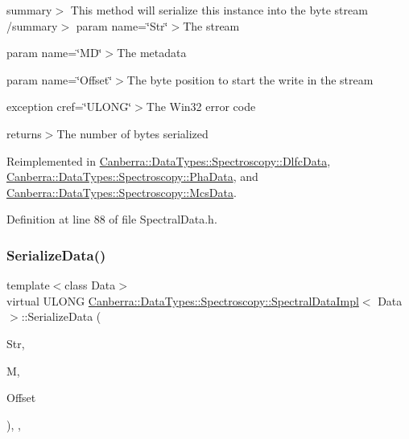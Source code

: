 summary$>$ This method will serialize this instance into the byte stream /summary$>$ param name=\char`\"{}\+Str\char`\"{}$>$The stream

param name=\char`\"{}\+M\+D\char`\"{}$>$The metadata

param name=\char`\"{}\+Offset\char`\"{}$>$The byte position to start the write in the stream

exception cref=\char`\"{}\+U\+L\+O\+N\+G\char`\"{}$>$The Win32 error code

returns$>$The number of bytes serialized

Reimplemented in \hyperlink{class_canberra_1_1_data_types_1_1_spectroscopy_1_1_dlfc_data_a90ac0d4fa457c81423ab25b9089dfa83_a90ac0d4fa457c81423ab25b9089dfa83}{Canberra\+::\+Data\+Types\+::\+Spectroscopy\+::\+Dlfc\+Data}, \hyperlink{class_canberra_1_1_data_types_1_1_spectroscopy_1_1_pha_data_a963a64048e3633af0a249054ce2c367f_a963a64048e3633af0a249054ce2c367f}{Canberra\+::\+Data\+Types\+::\+Spectroscopy\+::\+Pha\+Data}, and \hyperlink{class_canberra_1_1_data_types_1_1_spectroscopy_1_1_mcs_data_a7b3b725c711c1720c6c434d269f8664c_a7b3b725c711c1720c6c434d269f8664c}{Canberra\+::\+Data\+Types\+::\+Spectroscopy\+::\+Mcs\+Data}.



Definition at line 88 of file Spectral\+Data.\+h.

\mbox{\label{class_canberra_1_1_data_types_1_1_spectroscopy_1_1_spectral_data_impl_a4d4c4af29ad5f4fc977068478cdc8aeb_a4d4c4af29ad5f4fc977068478cdc8aeb}} 
\subsubsection{\texorpdfstring{Serialize\+Data()}{SerializeData()}}
{\footnotesize\ttfamily template$<$class Data$>$ \\
virtual U\+L\+O\+NG \hyperlink{class_canberra_1_1_data_types_1_1_spectroscopy_1_1_spectral_data_impl}{Canberra\+::\+Data\+Types\+::\+Spectroscopy\+::\+Spectral\+Data\+Impl}$<$ Data $>$\+::Serialize\+Data (\begin{DoxyParamCaption}\item[{\hyperlink{class_canberra_1_1_utility_1_1_core_1_1_byte_stream}{Canberra\+::\+Utility\+::\+Core\+::\+Byte\+Stream} \&}]{Str,  }\item[{const \hyperlink{class_canberra_1_1_serialization_1_1_meta_data}{Canberra\+::\+Serialization\+::\+Meta\+Data} \&}]{M,  }\item[{const L\+O\+NG}]{Offset }\end{DoxyParamCaption})\hspace{0.3cm}{\ttfamily [inline]}, {\ttfamily [protected]}, {\ttfamily [virtual]}}

